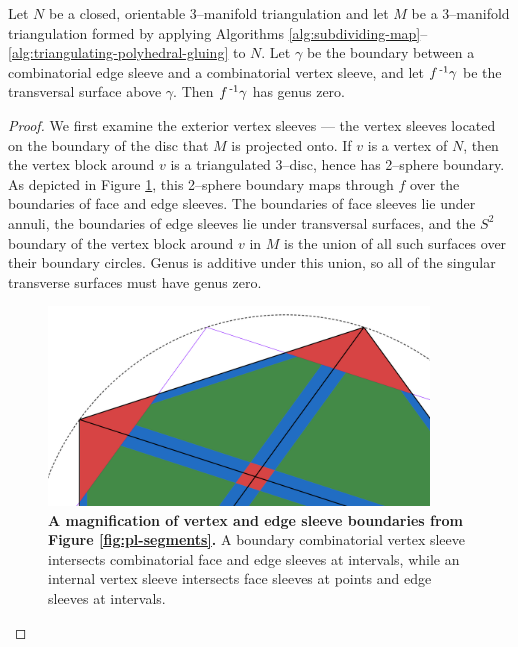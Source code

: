 \begin{lem}
	Let $N$ be a closed, orientable 3--manifold triangulation and let $M$ be a 3--manifold triangulation formed by applying Algorithms \ref{alg:subdividing-map}--\ref{alg:triangulating-polyhedral-gluing} to $N$.
	Let $\gamma$ be the boundary between a combinatorial edge sleeve and a combinatorial vertex sleeve, and let $f^{\,\text{-}1}\gamma$ be the transversal surface above $\gamma$.
	Then $f^{\,\text{-}1}\gamma$ has genus zero.
\end{lem}

\begin{proof}
	We first examine the exterior vertex sleeves ---  the vertex sleeves located on the boundary of the disc that $M$ is projected onto.
	If $v$ is a vertex of $N$, then the vertex block around $v$ is a triangulated 3--disc, hence has 2--sphere boundary.
	As depicted in Figure \ref{fig:pl-segments-zoom}, this 2--sphere boundary maps through $f$ over the boundaries of face and edge sleeves.
	The boundaries of face sleeves lie under annuli, the boundaries of edge sleeves lie under transversal surfaces, and the $S^2$ boundary of the vertex block around $v$ in $M$ is the union of all such surfaces over their boundary circles.
	Genus is additive under this union, so all of the singular transverse surfaces must have genus zero.
	
	\begin{figure}[h!]
		\centering
		\includegraphics[width=0.9\textwidth]{figures/pl-segments-zoom.png}
		\caption{
			\textbf{A magnification of vertex and edge sleeve boundaries from Figure \ref{fig:pl-segments}.}
			A boundary combinatorial vertex sleeve intersects combinatorial face and edge sleeves at intervals, while an internal vertex sleeve intersects face sleeves at points and edge sleeves at intervals.
		}
		\label{fig:pl-segments-zoom}
	\end{figure}
	

\end{proof}
